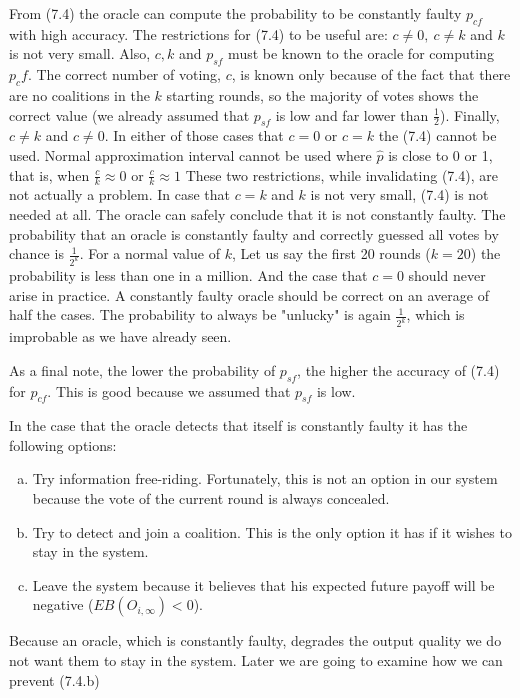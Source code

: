 \documentclass{article}
\begin{document}
\par From (7.4) the oracle can compute the probability to be constantly faulty $p_{cf}$ with high accuracy. The restrictions for (7.4) to be useful are: $c\neq0,~c\neq k$ and $k$ is not very small. Also,  $c,k$ and $p_{sf}$ must be known to the oracle for computing $p_cf$. The correct number of voting, $c$, is known only because of the fact that there are no coalitions in the $k$ starting rounds, so the majority of votes shows the correct value (we already assumed that $p_{sf}$ is low and far lower than $\frac{1}{2}$). Finally, $c\neq k$ and $c\neq0$. In either of those cases that $c=0$ or $c=k$ the (7.4) cannot be used. Normal approximation interval cannot be used where $\hat{p}$ is close to 0 or 1, that is, when $\frac{c}{k}\approx0$ or $\frac{c}{k}\approx1$ These two restrictions, while invalidating (7.4), are not actually a  problem. In case that $c=k$ and $k$ is not very small, (7.4) is not needed at all. The oracle can safely conclude that it is not constantly faulty. The probability that an oracle is constantly faulty and correctly guessed all votes by chance is $\frac{1}{2^k}$. For a normal value of $k$, Let us say the first 20 rounds ($k=20$) the probability is less than one in a million. And the case that $c=0$ should never arise in practice. A constantly faulty oracle should be correct on an average of half the cases. The probability to always be "unlucky" is again $\frac{1}{2^k}$, which is improbable as we have already seen.
\par As a final note, the lower the probability of $p_{sf}$, the higher the accuracy of (7.4) for $p_{cf}$. This is good because we assumed that $p_{sf}$ is low.
\par In the case that the oracle detects that itself is constantly faulty it has the following options:
\begin{enumerate}[(a)]
\item Try information free-riding. Fortunately, this is not an option in our system because the vote of the current round is always concealed.
\item Try to detect and join a coalition. This is the only option it has if it wishes to stay in the system.
\item Leave the system because it believes that his expected future payoff will be negative ($EB(O_{i,\infty})<0$).
\end{enumerate}
\par Because an oracle, which is constantly faulty, degrades the output quality we do not want them to stay in the system. Later we are going to examine how we can prevent (7.4.b)
\end{document}
